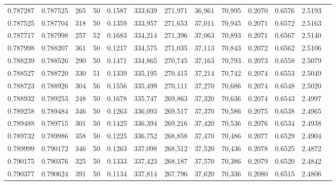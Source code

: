 \begin{tabular}{rrrrrrrrrrrrr}
0.787287 & 0.787525 &   265 &  50 &                                     0.1587 & 333,639 & 271,971 &  36,961 &  70,995 & 0.2070 & 0.6576 & 2.5193 \\
0.787525 & 0.787704 &   318 &  50 &                                     0.1359 & 333,957 & 271,653 &  37,011 &  70,945 & 0.2071 & 0.6572 & 2.5163 \\
0.787717 & 0.787998 &   257 &  52 &                                     0.1683 & 334,214 & 271,396 &  37,063 &  70,893 & 0.2071 & 0.6567 & 2.5140 \\
0.787998 & 0.788207 &   361 &  50 &                                     0.1217 & 334,575 & 271,035 &  37,113 &  70,843 & 0.2072 & 0.6562 & 2.5106 \\
0.788239 & 0.788526 &   290 &  50 &                                     0.1471 & 334,865 & 270,745 &  37,163 &  70,793 & 0.2073 & 0.6558 & 2.5079 \\
0.788527 & 0.788720 &   330 &  51 &                                     0.1339 & 335,195 & 270,415 &  37,214 &  70,742 & 0.2074 & 0.6553 & 2.5049 \\
0.788723 & 0.788926 &   304 &  56 &                                     0.1556 & 335,499 & 270,111 &  37,270 &  70,686 & 0.2074 & 0.6548 & 2.5020 \\
0.788932 & 0.789253 &   248 &  50 &                                     0.1678 & 335,747 & 269,863 &  37,320 &  70,636 & 0.2074 & 0.6543 & 2.4997 \\
0.789258 & 0.789484 &   346 &  50 &                                     0.1263 & 336,093 & 269,517 &  37,370 &  70,586 & 0.2075 & 0.6538 & 2.4965 \\
0.789488 & 0.789715 &   301 &  50 &                                     0.1425 & 336,394 & 269,216 &  37,420 &  70,536 & 0.2076 & 0.6534 & 2.4938 \\
0.789732 & 0.789986 &   358 &  50 &                                     0.1225 & 336,752 & 268,858 &  37,470 &  70,486 & 0.2077 & 0.6529 & 2.4904 \\
0.789999 & 0.790172 &   346 &  50 &                                     0.1263 & 337,098 & 268,512 &  37,520 &  70,436 & 0.2078 & 0.6525 & 2.4872 \\
0.790175 & 0.790376 &   325 &  50 &                                     0.1333 & 337,423 & 268,187 &  37,570 &  70,386 & 0.2079 & 0.6520 & 2.4842 \\
0.790377 & 0.790624 &   391 &  50 &                                     0.1134 & 337,814 & 267,796 &  37,620 &  70,336 & 0.2080 & 0.6515 & 2.4806 \\

\end{tabular}
